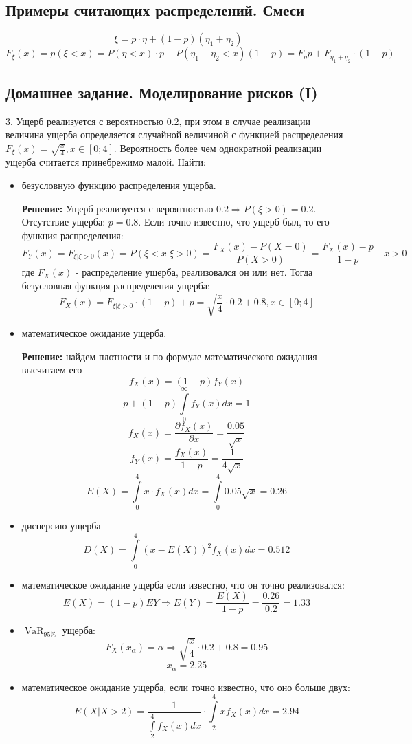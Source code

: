 \documentclass[%
12pt, %
final, %
oneside, %
onecolumn, %
centertags]{article} %
\theoremstyle{plain}
\theoremstyle{definition}
\theoremstyle{remark}
\begin{document}
\subsection{Примеры считающих распределений. Смеси}

$$\xi = p \cdot \eta + (1-p)(\eta_1 + \eta_2)$$
$$F_{\xi}(x) = p(\xi <x) = P(\eta < x) \cdot p + P(\eta_1 + \eta_2 < x)(1-p) = F_{\eta}p + F_{\eta_1 + \eta_2} \cdot (1-p)$$

\newpage

\subsection{Домашнее задание. Моделирование рисков (I)}

3. Ущерб реализуется с вероятностью $0.2$, при этом в случае реализации величина ущерба определяется случайной величиной с функцией распределения $F_{\xi}(x) = \sqrt{\frac{x}{4}}, x \in [0;4]$. Вероятность более чем однократной реализации ущерба считается принебрежимо малой. Найти:

\begin{itemize}
	\item безусловную функцию распределения ущерба.

	\textbf{Решение:} Ущерб реализуется с вероятностью $0.2 \Rightarrow P(\xi > 0) = 0.2$. Отсутствие ущерба: $p = 0.8$. Если точно известно, что ущерб был, то его функция распределения:
	$$F_{Y}(x) = F_{\xi \vert \xi >0}(x) = P(\xi < x \vert \xi > 0) = \frac{F_{X}(x) - P(X = 0)}{P(X >0)} = \frac{F_{X}(x) - p}{1 - p} \quad x>0$$
	где $F_{X}(x)$ - распределение ущерба, реализовался он или нет. Тогда безусловная функция распределения ущерба:
	$$F_{X}(x) = F_{\xi \vert \xi >0} \cdot (1-p) + p = \sqrt{\frac{x}{4}} \cdot 0.2 + 0.8, x \in [0;4]$$
	\item математическое ожидание ущерба.

	\textbf{Решение:} найдем плотности и по формуле математического ожидания высчитаем его
	$$f_{X}(x) = (1-p)f_{Y}(x)$$
	$$p + (1-p)\int\limits_0^{\infty}f_{Y}(x)dx = 1$$
	$$f_{X}(x) = \frac{\partial f_{X}(x)}{\partial x} = \frac{0.05}{\sqrt{x}}$$
	$$f_{Y}(x) = \frac{f_{X}(x)}{1-p} = \frac{1}{4\sqrt{x}}$$
	$$E(X) = \int\limits_0^4 x \cdot f_{X}(x) dx = \int\limits_0^4 0.05\sqrt{x} = 0.26$$
	\item дисперсию ущерба
	$$D(X) = \int\limits_0^4 (x - E(X))^2 f_{X}(x) dx = 0.512$$
	\item математическое ожидание ущерба если известно, что он точно реализовался:
	$$E(X) = (1-p)EY \Rightarrow E(Y) = \frac{E(X)}{1-p} = \frac{0.26}{0.2} =1.33$$
	\item $\operatorname{VaR}_{95\%}$ ущерба:
	$$F_{X}(x_{\alpha}) = \alpha \Rightarrow  \sqrt{\frac{x}{4}} \cdot 0.2 + 0.8 = 0.95$$
	$$x_{\alpha}  = 2.25$$
	\item математическое ожидание ущерба, если точно известно, что оно больше двух:
	$$E(X \vert X > 2) = \frac{1}{\int\limits_2^{4} f_{X}(x) dx} \cdot \int\limits_2^{4} xf_{X}(x)dx = 2.94$$

\end{itemize}
\end{document}

